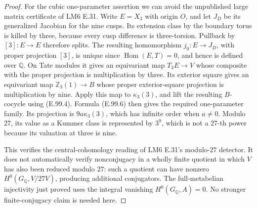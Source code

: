 \begin{proof}
For the cubic one-parameter assertion we can avoid the unpublished
large matrix certificate of LM6 E.31.  Write \(E=X_3\) with origin
\(O\), and let \(J_D\) be its generalized Jacobian for the nine
cusps.  Its extension class by the boundary torus is killed by
three, because every cusp difference is three-torsion.  Pullback
by \([3]:E\to E\) therefore splits.  The resulting homomorphism
\(j_0:E\to J_D\), with proper projection \([3]\), is unique since
\(\operatorname{Hom}(E,T)=0\), and hence is defined over
\(\mathbb Q\).  On Tate modules it gives an equivariant map
\(T_3E\to V\) whose composite with the proper projection is
multiplication by three.  Its exterior square gives an equivariant
map \(\mathbb Z_3(1)\to B\) whose proper exterior-square projection
is multiplication by nine.  Apply this map to \(\kappa_3(3)\), and
lift the resulting \(B\)-cocycle using (E.99.4).  Formula (E.99.6)
then gives the required one-parameter family.  Its projection is
\(9a\kappa_3(3)\), which has infinite order when \(a\ne0\).
Modulo \(27\), its value as a Kummer class is represented by
\(3^9\), which is not a \(27\)-th power because its valuation at
three is nine.

This verifies the central-cohomology reading of LM6 E.31's
modulo-\(27\) detector.  It does not automatically verify
nonconjugacy in a wholly finite quotient in which \(V\) has also
been reduced modulo \(27\): such a quotient can have nonzero
\(H^0(G_{\mathbb Q},V/27V)\), producing additional conjugators.
The full-metabelian injectivity just proved uses the integral
vanishing \(H^0(G_{\mathbb Q},A)=0\).  No stronger finite-conjugacy
claim is needed here.
\end{proof}

